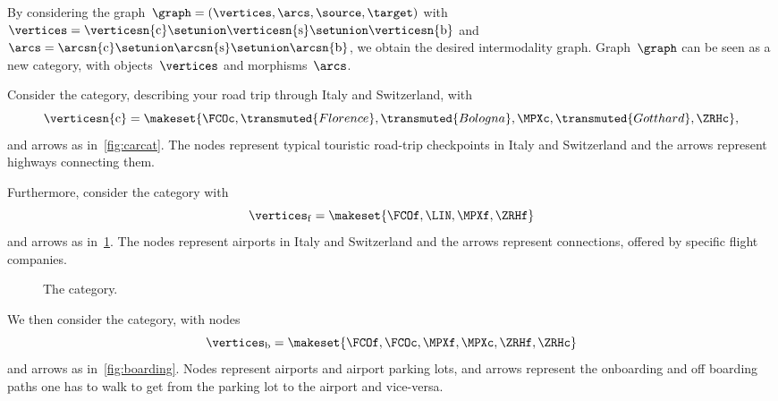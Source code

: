 By considering the graph~$\graph=(\vertices,\arcs,\source,\target)$ with~$\vertices=\verticesn{\mathrm{c}}\setunion \verticesn{\mathrm{s}}\setunion \verticesn{\mathrm{b}}$ and~$\arcs=\arcsn{\mathrm{c}}\setunion \arcsn{\mathrm{s}}\setunion \arcsn{\mathrm{b}}$, we obtain the desired intermodality graph.
Graph~$\graph$ can be seen as a new category, with objects~$\vertices$ and morphisms~$\arcs$.
\begin{example}
    \label{exa:car-category}
    Consider the \Car category, describing your road trip through Italy and Switzerland, with
    \begin{equation*}
        \verticesn{\mathrm{c}}=
        \makeset{
        \FCOc,
        \transmuted{Florence},
        \transmuted{Bologna},
        \MPXc,
        \transmuted{Gotthard},
        \ZRHc
        },
    \end{equation*}
    and arrows as in~\cref{fig:carcat}.
    The nodes represent typical touristic road-trip checkpoints in Italy and Switzerland and the arrows represent highways connecting them.

    \begin{figure*}[h!]
        \caption{The \Car category.}
        \label{fig:carcat}
    \end{figure*}

    Furthermore, consider the \Flight category with
    \begin{equation}
        \vertices_\mathrm{f}
        = \makeset{
        \FCOf,
        \LIN,
        \MPXf,
        \ZRHf
        }
    \end{equation}
    and arrows as in~\cref{fig:flight}.
    The nodes represent airports in Italy and Switzerland and the arrows represent connections, offered by specific flight companies.

    \begin{figure}[h!]
        \centering
        \caption{The \Flight category.}
        \label{fig:flight}
    \end{figure}

    We then consider the \Board category, with nodes
    \begin{equation*}
        \vertices_\mathrm{b}=\makeset{\FCOf,\FCOc,\MPXf,\MPXc,\ZRHf,\ZRHc}
    \end{equation*}
    and arrows as in~\cref{fig:boarding}.
    Nodes represent airports and airport parking lots, and arrows represent the onboarding and off boarding paths one has to walk to get from the parking lot to the airport and vice-versa.


\end{example}
